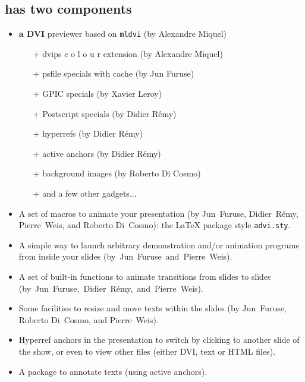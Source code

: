 \documentclass[12pt]{article}
\begin{document}
\newpage

\subsection* {{\ActiveDVI} has two components}

\begin{itemize}
\item {\bf a DVI} previewer based on \verb"mldvi" (by Alexandre Miquel)
\begin {itemize}
\item[+] dvips
  \textcolor{c1}{c}%
  \textcolor{c2}{o}%
  \textcolor{c3}{l}%
  \textcolor{c4}{o}%
  \textcolor{c5}{u}%
  \textcolor{c6}{r}
  extension (by Alexandre Miquel)
\item[+] psfile specials with cache (by Jun Furuse)
\item[+] GPIC specials (by Xavier Leroy)
\item[+] Postscript specials (by Didier R{\'{e}}my)
\item[+] hyperrefs (by Didier R{\'{e}}my)
\item[+] active anchors (by Didier R{\'{e}}my)
\item[+] background images (by Roberto Di Cosmo)
\item[+] and a few other gadgets...
\end {itemize}
\end{itemize}

\begin{itemize} \item A set of macros to animate your presentation (by
Jun~Furuse, Didier~R{\'{e}}my, Pierre~Weis, and Roberto Di~Cosmo): the
{\LaTeX} package style \verb"advi.sty".

\item A simple way to launch arbitrary demonstration and/or animation
programs from inside your slides \hbox {(by Jun~Furuse and
Pierre~Weis)}.

\item A set of built-in functions to animate transitions from slides
to slides \hbox {(by Jun~Furuse, Didier R{\'{e}}my, and Pierre Weis)}.

\item Some facilities to resize and move texts within the slides
(by Jun~Furuse, Roberto Di~Cosmo, and Pierre~Weis).

\item Hyperref anchors in the presentation to switch by clicking to
another slide of the show, or even to view other files (either DVI,
text or HTML files).

\item A package to annotate texts (using active anchors).

\end{itemize}
\end{document}
